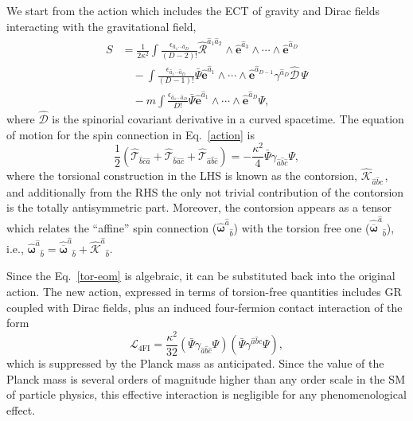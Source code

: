 \documentclass{ws-mpla}
\newcommand{\cdf}[1][]{{\boldsymbol{\mathcal{D}}}{#1}\!}
\newcommand{\ga}{\gamma}
\newcommand{\Lag}{\mathscr{L}}
\newcommand{\tor}{\mathcal{T}}
\newcommand{\we}{{\scriptstyle\wedge}}
\newcommand{\Bps}{\ensuremath{\bar{\Psi}}}
\newcommand\hvif[1]{\hat{\boldsymbol{e}}^{{#1}}}
\newcommand\SPIF[2]{\hat{\boldsymbol{\omega}}^{\hat{#1}}{}_{\hat{#2}}}
\newcommand{\hRif}[2]{\hat{\boldsymbol{\mathcal{R}}}^{{#1}}{}_{{#2}}}
\newcommand{\hcont}[3]{\hat{\mathcal{K}}_{#1}{}^{#2}{}_{#3}}
\newcommand{\CONTF}[2]{\hat{\boldsymbol{\mathcal{K}}}^{\hat{#1}}{}_{\hat{#2}}}
\renewcommand{\(}{\left(}
\renewcommand{\)}{\right)}
\renewcommand{\[}{\left[}
\renewcommand{\]}{\right]}
\newcommand{\hl}[1]{{\color{red} \bfseries{#1}}}
\begin{document}
We start from the action which includes the ECT of gravity and Dirac fields interacting with the gravitational field,
\begin{equation}
  \begin{split}
    S &= \frac{1}{2\kappa^2}\int\frac{\epsilon_{\hat{a}_1\cdots \hat{a}_D}}{(D-2)!}\hRif{\hat{a}_1 \hat{a}_2}{} \we \hvif{\hat{a}_3} \we \cdots \we \hvif{\hat{a}_D} \\
    & \quad - \int \frac{\epsilon_{\hat{a}_1\cdots \hat{a}_D}}{(D-1)!} \Bps \hvif{\hat{a}_1} \we \cdots \we \hvif{\hat{a}_{D-1}}\ga^{\hat{a}_D} \hat{\cdf} \, \Psi \\
    & \quad - m \int\frac{\epsilon_{\hat{a}_1\cdots \hat{a}_D}}{D!} \Bps \hvif{\hat{a}_1} \we \cdots \we \hvif{\hat{a}_{D}} \Psi,
  \end{split}
  \label{action}
\end{equation}
where $\hat{\cdf}$ is the spinorial covariant derivative in a curved spacetime. The equation of motion for the spin connection in Eq.~\eqref{action} is
\begin{equation}
  \frac{1}{2}\(\hat{\tor}_{\hat{b} \hat{c} \hat{a} } + \hat{\tor}_{\hat{b} \hat{a} \hat{c} } + \hat{\tor}_{\hat{a} \hat{b} \hat{c} }\) = -\frac{\kappa^2}{4} \bar{\Psi}\ga_{\hat{a} \hat{b} \hat{c}}\Psi,
  \label{tor-eom}
\end{equation}
where the torsional construction in the LHS is known as the contorsion, $\hcont{\hat{a} \hat{b} \hat{c} }{}{}$, and additionally from the RHS the only not trivial contribution of the contorsion is the totally antisymmetric part. Moreover, the contorsion appears as a tensor which relates the ``affine'' spin connection ($\SPIF{a}{b}$) with the torsion free one ($\hat{\overline{\boldsymbol{\omega}}}^{\hat{a}}{}_{\hat{b}}$), i.e., \mbox{$\SPIF{a}{b} = \hat{\overline{\boldsymbol{\omega}}}^{\hat{a}}{}_{\hat{b}}+\CONTF{a}{b}.$}  %

Since the  Eq.~\eqref{tor-eom} is algebraic, it can be substituted back into the original action. The new action, expressed in terms of torsion-free quantities includes GR coupled with Dirac fields, plus an  induced four-fermion contact interaction of the form
\begin{equation}
  \Lag_{\text{4FI}} = \frac{\kappa^2}{32} \( \bar{\Psi}\ga_{\hat{a} \hat{b} \hat{c}}\Psi \)  \( \bar{\Psi}\ga^{\hat{a} \hat{b} \hat{c}}\Psi \),
  \label{Lag4FI}
\end{equation}
which is suppressed by the Planck mass as anticipated. Since the value of the Planck mass is several orders of magnitude higher than any order scale in the SM of particle physics, this effective interaction is negligible for any phenomenological effect.
\end{document}
